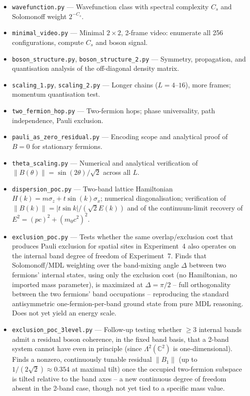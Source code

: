 \documentclass[11pt]{article}
\begin{document}
\begin{itemize}
  \item \texttt{wavefunction.py} --- Wavefunction class with spectral
        complexity $C_s$ and Solomonoff weight $2^{-C_s}$.
  \item \texttt{minimal\_video.py} --- Minimal $2\times 2$, 2-frame video:
        enumerate all 256 configurations, compute $C_s$ and boson signal.
  \item \texttt{boson\_structure.py}, \texttt{boson\_structure\_2.py} ---
        Symmetry, propagation, and quantisation analysis of the off-diagonal
        density matrix.
  \item \texttt{scaling\_1.py}, \texttt{scaling\_2.py} --- Longer chains
        ($L = 4$--$16$), more frames; momentum quantisation test.
  \item \texttt{two\_fermion\_hop.py} --- Two-fermion hops; phase universality,
        path independence, Pauli exclusion.
  \item \texttt{pauli\_as\_zero\_residual.py} --- Encoding scope and
        analytical proof of $B = 0$ for stationary fermions.
  \item \texttt{theta\_scaling.py} --- Numerical and analytical verification
        of $\|B(\theta)\| = \sin(2\theta)/\sqrt{2}$ across all $L$.
  \item \texttt{dispersion\_poc.py} --- Two-band lattice Hamiltonian
        $H(k) = m\sigma_z + t\sin(k)\sigma_x$; numerical diagonalisation;
        verification of $\|B(k)\| = |t\sin k|/(\sqrt{2}E(k))$ and of the
        continuum-limit recovery of $E^2=(pc)^2+(m_0c^2)^2$.
  \item \texttt{exclusion\_poc.py} --- Tests whether the same overlap/exclusion
    cost that produces Pauli exclusion for spatial sites in Experiment~4 also
    operates on the internal band degree of freedom of Experiment~7. Finds
    that Solomonoff/MDL weighting over the band-mixing angle $\Delta$ between
    two fermions' internal states, using only the exclusion cost (no
    Hamiltonian, no imported mass parameter), is maximized at
    $\Delta = \pi/2$ -- full orthogonality between the two fermions' band
    occupations -- reproducing the standard antisymmetric one-fermion-per-band
    ground state from pure MDL reasoning. Does not yet yield an energy scale.
  \item \texttt{exclusion\_poc\_3level.py} --- Follow-up testing whether
    $\geq 3$ internal bands admit a residual boson coherence, in the fixed
    band basis, that a 2-band system cannot have even in principle (since
    $\Lambda^2(\mathbb{C}^2)$ is one-dimensional). Finds a nonzero,
    continuously tunable residual $\|B_1\|$ (up to $1/(2\sqrt2)\approx 0.354$
    at maximal tilt) once the occupied two-fermion subspace is tilted
    relative to the band axes -- a new continuous degree of freedom absent
    in the 2-band case, though not yet tied to a specific mass value.
\end{itemize}

\printbibliography
\end{document}
